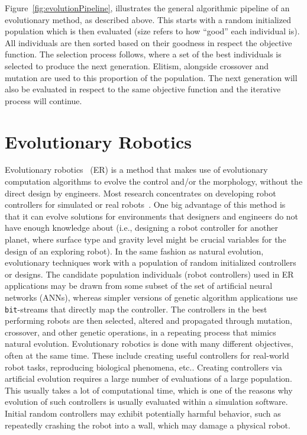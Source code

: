 Figure~\ref{fig:evolutionPipeline}, illustrates the general algorithmic pipeline of an evolutionary method, as described above. This starts with a random initialized population which is then evaluated (size refers to how ``good'' each individual is). All individuals are then sorted based on their goodness in respect the objective function. The selection process follows, where a set of the best individuals is selected to produce the next generation. Elitism, alongside crossover and mutation are used to this proportion of the population. The next generation will also be evaluated in respect to the same objective function and the iterative process will continue.

\section{Evolutionary Robotics}
\label{sec:evolutionary_robotics}

Evolutionary robotics~\citep{nolfi2001evolutionary} (ER) is a method that makes use of evolutionary computation algorithms to evolve the control and/or the morphology, without the direct design by engineers. Most research concentrates on developing robot controllers for simulated or real robots~\citep{harvey1997evolutionary,nolfi1994evolve}. One big advantage of this method is that it can evolve solutions for environments that designers and engineers do not have enough knowledge about (i.e., designing a robot controller for another planet, where surface type and gravity level might be crucial variables for the design of an exploring robot). In the same fashion as natural evolution, evolutionary techniques work with a population of random initialized controllers or designs. The candidate population individuals (robot controllers) used in ER applications may be drawn from some subset of the set of artificial neural networks (ANNs), whereas simpler versions of genetic algorithm applications use \texttt{bit}-streams that directly map the controller. The controllers in the best performing robots are then selected, altered and propagated through mutation, crossover, and other genetic operations, in a repeating process that mimics natural evolution. Evolutionary robotics is done with many different objectives, often at the same time. These include creating useful controllers for real-world robot tasks, reproducing biological phenomena, etc.. Creating controllers via artificial evolution requires a large number of evaluations of a large population. This usually takes a lot of computational time, which is one of the reasons why evolution of such controllers is usually evaluated within a simulation software. Initial random controllers may exhibit potentially harmful behavior, such as repeatedly crashing the robot into a wall, which may damage a physical robot.

